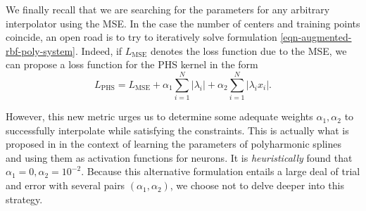 \documentclass[12pt]{report} %
\newcommand{\tmop}[1]{\ensuremath{\operatorname{#1}}}
\begin{document}
We finally recall that we are searching for the parameters for any arbitrary interpolator using the MSE. In the case the number of centers and training points coincide, an open road is to try to iteratively solve formulation \eqref{eqn-augmented-rbf-poly-system}. Indeed, if $L_{\text{MSE}}$ denotes the loss function due to the MSE, we can propose a loss function for the PHS kernel in the form
\begin{equation}
  L_{\text{PHS}} = L_{\tmop{MSE}} + \alpha_1 \sum_{i = 1}^N | \lambda_i | +
  \alpha_2 \sum_{i = 1}^N | \lambda_i x_i |. \label{eqn-alternative-loss-function}
\end{equation}

However, this new metric urges us to determine some adequate weights $\alpha_1,\alpha_2$ to successfully interpolate while satisfying the constraints. This is actually what is proposed in \cite{hryniowski2018polyneuron} in the context of learning the parameters of polyharmonic splines and using them as activation functions for neurons. It is \textit{heuristically} found that $\alpha_1=0,\alpha_2=10^{-2}$. Because this alternative formulation entails a large deal of trial and error with several pairs $(\alpha_1,\alpha_2)$, we choose not to delve deeper into this strategy. 
\end{document}
